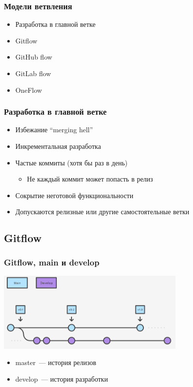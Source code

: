 \documentclass{../../slides-style}
\begin{document}
    \begin{frame}
        \frametitle{Модели ветвления}
        \begin{itemize}
            \item Разработка в главной ветке
            \item Gitflow
            \item GitHub flow
            \item GitLab flow
            \item OneFlow
        \end{itemize}
    \end{frame}

    \begin{frame}
        \frametitle{Разработка в главной ветке}
        \begin{itemize}
            \item Избежание ``merging hell''
            \item Инкрементальная разработка
            \item Частые коммиты (хотя бы раз в день)
            \begin{itemize}
                \item Не каждый коммит может попасть в релиз
            \end{itemize}
            \item Сокрытие неготовой функциональности
            \item Допускаются релизные или другие самостоятельные ветки
        \end{itemize}
    \end{frame}

    \subsection{Gitflow}

    \begin{frame}
        \frametitle{Gitflow, main и develop}
        \begin{center}
            \includegraphics[width=0.7\textwidth]{gitflow1.png}
        \end{center}
        \begin{itemize}
            \item master~--- история релизов
            \item develop~--- история разработки
        \end{itemize}
    \end{frame}
\end{document}
